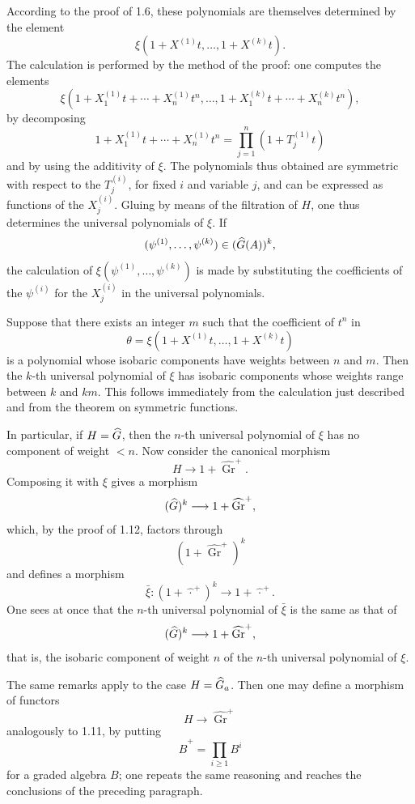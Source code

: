 \documentclass[11pt]{article}
\begin{document}
According to the proof of 1.6, these polynomials are themselves determined by the element
\[
  \xi(1+X^{(1)}t,\ldots,1+X^{(k)}t).
\]
The calculation is performed by the method of the proof: one computes the elements
\[
  \xi(1+X_1^{(1)}t+\cdots+X_n^{(1)}t^n,\ldots,
        1+X_1^{(k)}t+\cdots+X_n^{(k)}t^n),
\]
by decomposing
\[
  1+X_1^{(1)}t+\cdots+X_n^{(1)}t^n
  =\prod_{j=1}^n(1+T_j^{(1)}t)
\]
and by using the additivity of \(\xi\). The polynomials thus obtained are symmetric with respect to the \(T_j^{(i)}\), for fixed \(i\) and variable \(j\), and can be expressed as functions of the \(X_j^{(i)}\). Gluing by means of the filtration of \(H\), one thus determines the universal polynomials of \(\xi\). If
\[
  (\psi^{(1)},\ldots,\psi^{(k)})\in(\widehat G(A))^k,
\]
the calculation of \(\xi(\psi^{(1)},\ldots,\psi^{(k)})\) is made by substituting the coefficients of the \(\psi^{(i)}\) for the \(X_j^{(i)}\) in the universal polynomials.

Suppose that there exists an integer \(m\) such that the coefficient of \(t^n\) in
\[
  \theta=\xi(1+X^{(1)}t,\ldots,1+X^{(k)}t)
\]
is a polynomial whose isobaric components have weights between \(n\) and \(m\). Then the \(k\)-th universal polynomial of \(\xi\) has isobaric components whose weights range between \(k\) and \(km\). This follows immediately from the calculation just described and from the theorem on symmetric functions.

In particular, if \(H=\widehat G\), then the \(n\)-th universal polynomial of \(\xi\) has no component of weight \(<n\). Now consider the canonical morphism
\[
  H\longrightarrow 1+\widehat{\operatorname{Gr}}^{+}.
\]
Composing it with \(\xi\) gives a morphism
\[
  (\widehat G)^k\longrightarrow 1+\widehat{\operatorname{Gr}}^{+},
\]
which, by the proof of 1.12, factors through
\[
  (1+\widehat{\operatorname{Gr}}^{+})^k
\]
and defines a morphism
\[
  \bar\xi:(1+\widehat{\,\cdot\,}^{+})^k\longrightarrow 1+\widehat{\,\cdot\,}^{+}.
\]
One sees at once that the \(n\)-th universal polynomial of \(\bar\xi\) is the same as that of
\[
  (\widehat G)^k\longrightarrow 1+\widehat{\operatorname{Gr}}^{+},
\]
that is, the isobaric component of weight \(n\) of the \(n\)-th universal polynomial of \(\xi\).

The same remarks apply to the case \(H=\widehat G_a\). Then one may define a morphism of functors
\[
  H\longrightarrow \widehat{\operatorname{Gr}}^{+}
\]
analogously to 1.11, by putting
\[
  \widehat B^{+}=\prod_{i\geq 1}B^i
\]
for a graded algebra \(B\); one repeats the same reasoning and reaches the conclusions of the preceding paragraph.
\end{document}
